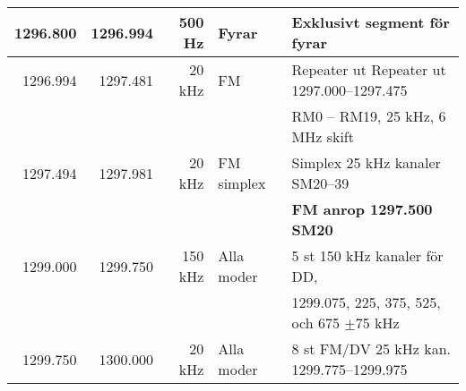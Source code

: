 \begin{tabular}{rrrll}
1296.800 & 1296.994 & 500 Hz  & Fyrar        & Exklusivt segment för fyrar                   \\ \hline
1296.994 & 1297.481 & 20 kHz  & FM           & Repeater ut Repeater ut 1297.000--1297.475    \\
         &          &         &              & RM0 – RM19, 25 kHz, 6 MHz skift               \\ \hline
1297.494 & 1297.981 & 20 kHz  & FM simplex   & Simplex 25 kHz kanaler SM20--39               \\
         &          &         &              & \textbf{FM anrop 1297.500 SM20}               \\ \hline
1299.000 & 1299.750 & 150 kHz & Alla moder   & 5 st 150 kHz kanaler för DD,                  \\
         &          &         &              & 1299.075, 225, 375, 525, och 675 $\pm$75 kHz  \\ \hline
1299.750 & 1300.000 & 20 kHz  & Alla moder   & 8 st FM/DV 25 kHz kan. 1299.775--1299.975
\end{tabular}

\clearpage

\twocolumn

